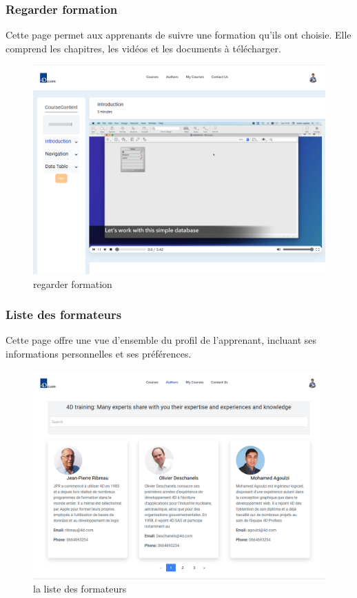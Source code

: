 \subsubsection{Regarder formation}

Cette page permet aux apprenants de suivre une formation qu'ils ont choisie. Elle comprend les chapitres, les vidéos et les documents à télécharger.

\begin{figure}[H]
    \centering
    \includegraphics[width=19cm]{Figures/video.png}
    \caption{regarder formation}
\end{figure}

\subsubsection{Liste des formateurs}

Cette page offre une vue d'ensemble du profil de l'apprenant, incluant ses informations personnelles et ses préférences.

\begin{figure}[H]
    \centering
    \includegraphics[width=19cm]{Figures/authors.png}
    \caption{la liste des formateurs}
\end{figure}

